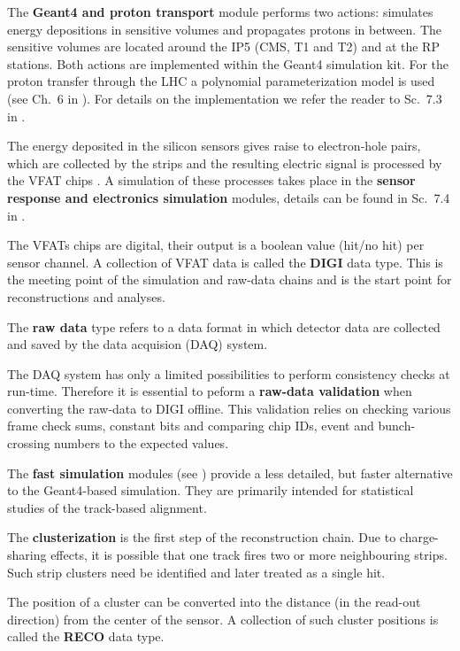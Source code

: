\> The {\bf Geant4 and proton transport} module performs two actions: simulates energy depositions in sensitive volumes and propagates protons in between. The sensitive volumes are located around the IP5 (CMS, T1 and T2) and at the RP stations. Both actions are implemented within the Geant4  simulation kit. For the proton transfer through the LHC a polynomial parameterization model is used (see Ch.~6 in ). For details on the implementation we refer the reader to Sc.~7.3 in .

\> The energy deposited in the silicon sensors gives raise to electron-hole pairs, which are collected by the strips and the resulting electric signal is processed by the VFAT chips . A simulation of these processes takes place in the {\bf sensor response and electronics simulation} modules, details can be found in Sc.~7.4 in .

\> The VFATs chips are digital, their output is a boolean value (hit/no hit) per sensor channel. A collection of VFAT data is called the {\bf DIGI} data type. This is the meeting point of the simulation and raw-data chains and is the start point for reconstructions and analyses.

\> The {\bf raw data} type refers to a data format in which detector data are collected and saved by the data acquision (DAQ) system.

\> The DAQ system has only a limited possibilities to perform consistency checks at run-time. Therefore it is essential to peform a {\bf raw-data validation} when converting the raw-data to DIGI offline. This validation relies on checking various frame check sums, constant bits and comparing chip IDs, event and bunch-crossing numbers to the expected values.

\> The {\bf fast simulation} modules (see ) provide a less detailed, but faster alternative to the Geant4-based simulation. They are primarily intended for statistical studies of the track-based alignment.

\> The {\bf clusterization} is the first step of the reconstruction chain. Due to charge-sharing effects, it is possible that one track fires two or more neighbouring strips. Such strip clusters need be identified and later treated as a single hit.

\> The position of a cluster can be converted into the distance (in the read-out direction) from the center of the sensor. A collection of such cluster positions is called the {\bf RECO} data type.


